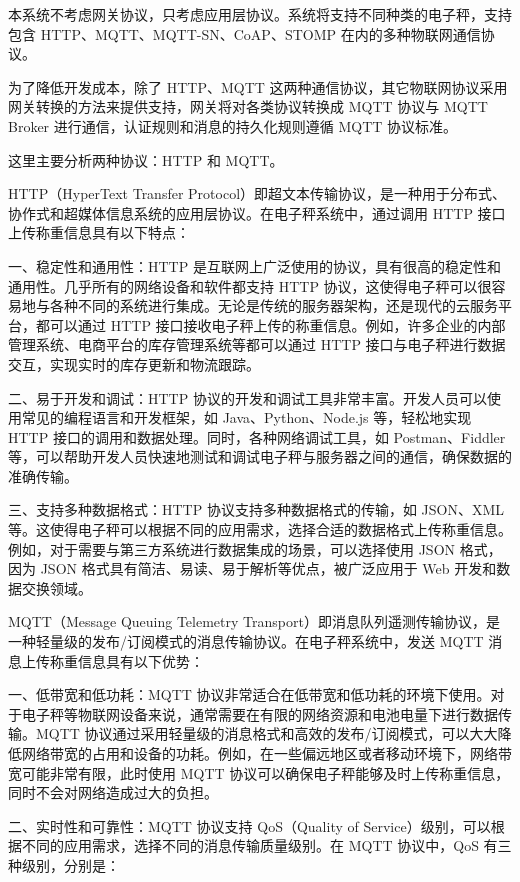 本系统不考虑网关协议，只考虑应用层协议。系统将支持不同种类的电子秤，支持包含 HTTP、MQTT、MQTT-SN、CoAP、STOMP 在内的多种物联网通信协议。

为了降低开发成本，除了 HTTP、MQTT 这两种通信协议，其它物联网协议采用网关转换的方法来提供支持，网关将对各类协议转换成 MQTT 协议与 MQTT Broker 进行通信，认证规则和消息的持久化规则遵循 MQTT 协议标准。

这里主要分析两种协议：HTTP 和 MQTT。

HTTP（HyperText Transfer Protocol）即超文本传输协议，是一种用于分布式、协作式和超媒体信息系统的应用层协议。在电子秤系统中，通过调用 HTTP 接口上传称重信息具有以下特点：

一、稳定性和通用性：HTTP 是互联网上广泛使用的协议，具有很高的稳定性和通用性。几乎所有的网络设备和软件都支持 HTTP 协议，这使得电子秤可以很容易地与各种不同的系统进行集成。无论是传统的服务器架构，还是现代的云服务平台，都可以通过 HTTP 接口接收电子秤上传的称重信息。例如，许多企业的内部管理系统、电商平台的库存管理系统等都可以通过 HTTP 接口与电子秤进行数据交互，实现实时的库存更新和物流跟踪\cite{Zhao2016}。

二、易于开发和调试：HTTP 协议的开发和调试工具非常丰富。开发人员可以使用常见的编程语言和开发框架，如 Java、Python、Node.js 等，轻松地实现 HTTP 接口的调用和数据处理。同时，各种网络调试工具，如 Postman、Fiddler 等，可以帮助开发人员快速地测试和调试电子秤与服务器之间的通信，确保数据的准确传输。

三、支持多种数据格式：HTTP 协议支持多种数据格式的传输，如 JSON、XML 等。这使得电子秤可以根据不同的应用需求，选择合适的数据格式上传称重信息。例如，对于需要与第三方系统进行数据集成的场景，可以选择使用 JSON 格式，因为 JSON 格式具有简洁、易读、易于解析等优点，被广泛应用于 Web 开发和数据交换领域。

MQTT（Message Queuing Telemetry Transport）即消息队列遥测传输协议，是一种轻量级的发布/订阅模式的消息传输协议。在电子秤系统中，发送 MQTT 消息上传称重信息具有以下优势：

一、低带宽和低功耗：MQTT 协议非常适合在低带宽和低功耗的环境下使用。对于电子秤等物联网设备来说，通常需要在有限的网络资源和电池电量下进行数据传输。MQTT 协议通过采用轻量级的消息格式和高效的发布/订阅模式，可以大大降低网络带宽的占用和设备的功耗。例如，在一些偏远地区或者移动环境下，网络带宽可能非常有限，此时使用 MQTT 协议可以确保电子秤能够及时上传称重信息，同时不会对网络造成过大的负担\cite{Jia2015}。

二、实时性和可靠性：MQTT 协议支持 QoS（Quality of Service）级别，可以根据不同的应用需求，选择不同的消息传输质量级别。在 MQTT 协议中，QoS 有三种级别\cite{Jia2015}，分别是：

